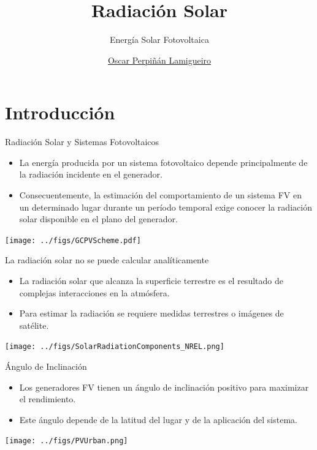 \documentclass[xcolor={usenames,svgnames,dvipsnames}]{beamer}
\author{\href{https://oscarperpinan.github.io}{Oscar Perpiñán Lamigueiro}}
\date{}
\title{Radiación Solar}
\subtitle{Energía Solar Fotovoltaica}
\institute[UPM]{Universidad Politécnica de Madrid}
\begin{document}
\maketitle

\section{Introducción}
\label{sec:orgd51ff21}

\begin{frame}[label={sec:org1f37f4b}]{Radiación Solar y Sistemas Fotovoltaicos}
\begin{itemize}
\item La \alert{energía producida} por un sistema fotovoltaico depende principalmente de la \alert{radiación incidente} en el generador.

\item Consecuentemente, la \alert{estimación del comportamiento} de un sistema FV en un determinado lugar durante un período temporal exige \alert{conocer la radiación solar disponible en el plano del generador}.
\end{itemize}

\begin{center}
\texttt{[image: ../figs/GCPVScheme.pdf]}
\end{center}
\end{frame}

\begin{frame}[label={sec:orgf617431}]{La radiación solar no se puede calcular analíticamente}
\begin{itemize}
\item La radiación solar que alcanza la superficie terrestre es el resultado de complejas interacciones en la atmósfera.
\item Para estimar la radiación se requiere medidas terrestres o imágenes de satélite.
\end{itemize}
\begin{center}
\texttt{[image: ../figs/SolarRadiationComponents\_NREL.png]}
\end{center}
\end{frame}

\begin{frame}[label={sec:orgb0e6f4e}]{Ángulo de Inclinación}
\begin{itemize}
\item Los generadores FV tienen un \alert{ángulo de inclinación positivo} para maximizar el rendimiento.
\item Este ángulo depende de la \alert{latitud} del lugar y de la \alert{aplicación del sistema}.
\end{itemize}

\begin{center}
\texttt{[image: ../figs/PVUrban.png]}
\end{center}
\end{frame}
\end{document}
